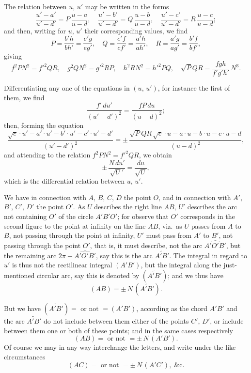\documentclass[12pt,a4paper]{article}
\begin{document}
\newpage

\noindent
The relation between $u$, $u'$ may be written in the forms
\[
\frac{u'-a'}{u'-d'} = P\,\frac{u-a}{u-d}, \quad \frac{u'-b'}{u'-d'} = Q\,\frac{u-b}{u-d}, \quad \frac{u'-c'}{u'-d'} = R\,\frac{u-c}{u-d};
\]
and then, writing for $u$, $u'$ their corresponding values, we find
\[
P = \frac{b'h}{bh'} = \frac{e'g}{eg'}, \quad Q = \frac{e'f}{cf'} = \frac{a'h}{ah'}, \quad R = \frac{a'g}{ag'} = \frac{b'f}{bf'},
\]
giving
\[
f^2PN^2 = f'^2QR, \quad g^2QN^2 = g'^2RP, \quad h^2RN^2 = h'^2PQ, \quad \surd PQR = \frac{fgh}{f'g'h'}\,N^3.
\]

Differentiating any one of the equations in $(u,\,u')$, for instance the first of them, we find
\[
\frac{f'\,du'}{(u'-d')^2} = \frac{fP\,du}{(u-d)^2};
\]
then, forming the equation
\[
\frac{\surd e \cdot u'-a' \cdot u'-b' \cdot u'-c' \cdot u'-d'}{(u'-d')^2} = \pm\,\frac{\surd PQR\,\surd e \cdot u-a \cdot u-b \cdot u-c \cdot u-d}{(u-d)^2},
\]
and attending to the relation $f^2PN^2 = f'^2QR$, we obtain
\[
\pm\,\frac{N\,du'}{\surd U'} = \frac{du}{\surd U},
\]
which is the differential relation between $u$, $u'$.

We have in connection with $A$, $B$, $C$, $D$ the point $O$, and in connection with $A'$, $B'$, $C'$, $D'$ the point $O'$. As $U$ describes the right line $AB$, $U'$ describes the arc not containing $O'$ of the circle $A'B'O'$; for observe that $O'$ corresponds in the second figure to the point at infinity on the line $AB$, viz.\ as $U$ passes from $A$ to $B$, not passing through the point at infinity, $U'$ must pass from $A'$ to $B'$, not passing through the point $O'$, that is, it must describe, not the arc $\widehat{A'O'B'}$, but the remaining arc $2\pi - \widehat{A'O'B'}$, say this is the arc $\widetilde{A'B'}$. The integral in regard to $u'$ is thus not the rectilinear integral $(A'B')$, but the integral along the just-mentioned circular arc, say this is denoted by $(\widetilde{A'B'})$; and we thus have
\[
(AB) = \pm\,N\,(\widetilde{A'B'}).
\]

But we have $(\widetilde{A'B'}) = $ or not $= (A'B')$, according as the chord $A'B'$ and the arc $\widetilde{A'B'}$ do not include between them either of the points $C'$, $D'$, or include between them one or both of these points; and in the same cases respectively
\[
(AB) = \text{ or not } = \pm\,N\,(A'B').
\]
Of course we may in any way interchange the letters, and write under the like circumstances
\[
(AC) = \text{ or not } = \pm\,N\,(A'C'), \;\&\text{c.}
\]
\end{document}
